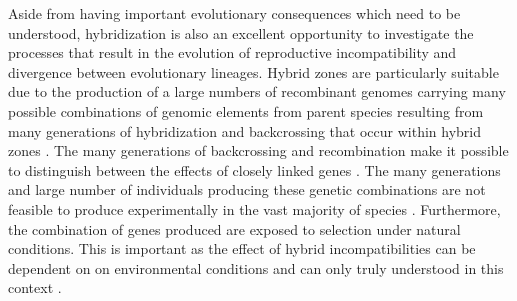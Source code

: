 Aside from having important evolutionary consequences which need to be understood, 
hybridization is also an excellent opportunity to investigate the processes
that result in the evolution of reproductive incompatibility and divergence between 
evolutionary lineages. 
Hybrid zones are particularly suitable due to the production of a large numbers of 
recombinant genomes carrying many possible combinations of genomic elements from parent 
species resulting from many generations of hybridization and backcrossing that occur
within hybrid zones \parencite{rieseberg1999}. 
The many generations of backcrossing and recombination make it possible to 
distinguish between the effects of closely linked genes \parencite{rieseberg1999}. 
The many generations and large number of individuals producing these genetic 
combinations are not feasible to produce experimentally in the vast majority of
species \parencite{rieseberg1999}. 
Furthermore, the combination of genes produced are exposed to selection 
under natural conditions. 
This is important as the effect of hybrid incompatibilities can be dependent on 
on environmental conditions and can only truly understood in this context \parencite{miller2016}. 


